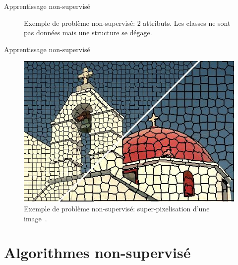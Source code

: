 \documentclass[8pt]{beamer}
\begin{document}
			\begin{frame}{Apprentissage non-supervisé}
				\begin{figure}[H]
					\begin{center}
						
						\caption*{\tiny Exemple de problème non-supervisé: 2 attributs. Les classes ne sont pas données mais une structure se dégage.}
					\end{center}
				\end{figure}
			\end{frame}

			\begin{frame}{Apprentissage non-supervisé}
				\begin{figure}[H]
					\begin{center}
						\includegraphics[height=.5\textheight]{images/samples/superpixels}
						\caption*{\tiny Exemple de problème non-supervisé: super-pixelisation d'une image~\cite{achanta2012slic}.}
					\end{center}
				\end{figure}
			\end{frame}
	\section{Algorithmes non-supervisé}
\end{document}
